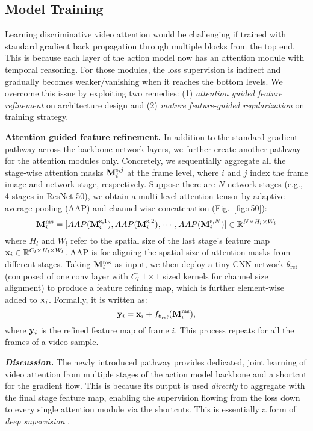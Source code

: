\documentclass[runningheads]{llncs}
\newcommand{\keypoint}[1]{\vspace{0.1cm}\noindent\textbf{#1}\quad}
\begin{document}
\subsection{Model Training}
\label{sec:model}
Learning discriminative video attention would be challenging if trained with standard gradient back propagation through multiple blocks from the top end.
This is because each layer of the action model now has an attention module with temporal reasoning. For those modules, the loss supervision is indirect and
gradually becomes weaker/vanishing when it reaches the bottom levels.
We overcome this issue by exploiting two remedies:
(1) {\em attention guided feature refinement} on architecture design
and 
(2) {\em mature feature-guided regularization} on training strategy. 

\keypoint{Attention guided feature refinement.}
In addition to the standard gradient pathway across the backbone network layers,
we further create another pathway for the attention modules only. Concretely,  we sequentially aggregate all the stage-wise attention masks ${\bf M}_i^{\text{s},j}$ at the frame level, where 
$i$ and $j$ index the frame image and network stage, respectively.
Suppose there are $N$ network stages (e.g., 4 stages in ResNet-50),
we obtain a multi-level attention tensor by adaptive average pooling (AAP) and channel-wise concatenation (Fig.~\ref{fig:r50}):
\begin{equation}
    {\bf M}_i^\text{ms} = [AAP({\bf M}_i^{\text{s},1}), AAP({\bf M}_i^{\text{s},2}), \cdots,
AAP({\bf M}_i^{\text{s},N}) ] \in \mathbb{R}^{N\times H_l \times W_l}
\end{equation}
where $H_l$ and $W_l$ refer to the spatial size of the last stage's feature map ${\bf x}_i \in \mathbb{R}^{C_l \times H_l \times W_l}$.
AAP is for aligning the spatial size of attention masks
from different stages.
Taking ${\bf M}_i^\text{ms}$ as input, we then deploy a tiny CNN network $\theta_\text{ref}$ (composed of one conv layer with $C_l$ $1\times1$ sized kernels for channel size alignment) to produce a feature refining map,
which is further element-wise added to ${\bf x}_i$. Formally, it is written as: 
\begin{equation}
  {\bf y}_i =  {\bf x}_i + f_{\theta_\text{ref}}({\bf M}_i^\text{ms}),
  \label{eq:att_ds}
\end{equation}
where ${\bf y}_i$ is the refined feature map of frame $i$.
This process repeats for all the frames of a video sample. 

\textbf{\em Discussion. }
The newly introduced pathway provides
dedicated, joint learning of video attention from multiple stages of the action model backbone and  a shortcut for the gradient flow.
This is because its output is used {\em directly} to aggregate with the final stage feature map, enabling the supervision flowing from the loss down to every single attention module via the shortcuts.
This is essentially a form of  {\em deep supervision} \cite{chang2018multi,lee2015deeply}.
\end{document}
